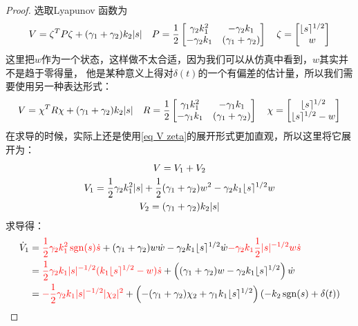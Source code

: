 \begin{proof}
	
	选取Lyapunov 函数为
	\begin{equation}
		\label{eq V zeta}
		V=\zeta^T P \zeta + (\gamma_1 +\gamma_2)k_2 |s|\quad 
		P=\frac12 \begin{bmatrix}
			\gamma_2 k_1^2  & -\gamma_2 k_1\\
			-\gamma_2 k_1 & (\gamma_1+\gamma_2)\\
		\end{bmatrix}
		\quad 
		\zeta =\begin{bmatrix}
			\lfloor s \rceil^{1/2}\\
			w
		\end{bmatrix}
	\end{equation}
	这里把$w$作为一个状态，这样做不太合适，因为我们可以从仿真中看到，$w$其实并不是趋于零得量，
	他是某种意义上得对$\delta(t)$的一个有偏差的估计量，所以我们需要使用另一种表达形式：
	\begin{equation}
		V=\chi^T R \chi + (\gamma_1 +\gamma_2)k_2 |s|\quad 
		R=\frac12 \begin{bmatrix}
			\gamma_1 k_1^2  & -\gamma_1 k_1\\
			-\gamma_1 k_1 & (\gamma_1+\gamma_2)\\
		\end{bmatrix}\quad 
		\chi=\begin{bmatrix}
			\lfloor s \rceil^{1/2}\\
			\lfloor s \rceil^{1/2}-w
		\end{bmatrix}
	\end{equation}
	在求导的时候，实际上还是使用\eqref{eq V zeta}的展开形式更加直观，所以这里将它展开为：
	\begin{gather*}
		V=V_1+V_2\\
		V_1=\frac12 \gamma_2 k_1^2 |s|
		+ \frac12(\gamma_1+\gamma_2) w^2
		-\gamma_2 k_1 \lfloor s \rceil^{1/2}w
		\\
		V_2=(\gamma_1+\gamma_2)k_2 |s|
	\end{gather*}
	求导得：
	\begin{align*}
		\dot{V}_1
		&=\tR{\frac12 \gamma_2 k_1^2 \sgn{s}\dot{s}}
		+(\gamma_1+\gamma_2) w \dot{w}
		-\gamma_2 k_1 \sig{s}^{1/2}\dot{w}
		\tR{-\gamma_2 k_1 \frac12 |s|^{-1/2}w\dot{s}}
		\\
		&=\tR{\frac12 \gamma_2 k_1 |s|^{-1/2} (k_1\sig{s}^{1/2}-w)\dot{s}}
		+\left((\gamma_1+\gamma_2) w -\gamma_2 k_1 \sig{s}^{1/2}\right)\dot{w}
		\\
		&=\tR{-\frac12 \gamma_2 k_1 |s|^{-1/2} |\chi_2|^2}
		+\left(-(\gamma_1+\gamma_2) \chi_2 +\gamma_1 k_1 \sig{s}^{1/2}\right)(-k_2\sgn{s}+\delta(t))

\end{align*}
\end{proof}
